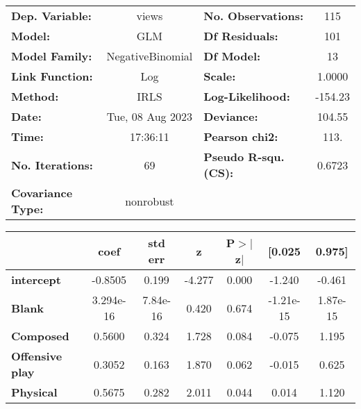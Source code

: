 \begin{center}
\begin{tabular}{lclc}
\toprule
\textbf{Dep. Variable:}         &      views       & \textbf{  No. Observations:  } &      115    \\
\textbf{Model:}                 &       GLM        & \textbf{  Df Residuals:      } &      101    \\
\textbf{Model Family:}          & NegativeBinomial & \textbf{  Df Model:          } &       13    \\
\textbf{Link Function:}         &       Log        & \textbf{  Scale:             } &    1.0000   \\
\textbf{Method:}                &       IRLS       & \textbf{  Log-Likelihood:    } &   -154.23   \\
\textbf{Date:}                  & Tue, 08 Aug 2023 & \textbf{  Deviance:          } &    104.55   \\
\textbf{Time:}                  &     17:36:11     & \textbf{  Pearson chi2:      } &     113.    \\
\textbf{No. Iterations:}        &        69        & \textbf{  Pseudo R-squ. (CS):} &   0.6723    \\
\textbf{Covariance Type:}       &    nonrobust     & \textbf{                     } &             \\
\bottomrule
\end{tabular}
\begin{tabular}{lcccccc}
                                & \textbf{coef} & \textbf{std err} & \textbf{z} & \textbf{P$> |$z$|$} & \textbf{[0.025} & \textbf{0.975]}  \\
\midrule
\textbf{intercept}              &      -0.8505  &        0.199     &    -4.277  &         0.000        &       -1.240    &       -0.461     \\
\textbf{Blank}                  &    3.294e-16  &     7.84e-16     &     0.420  &         0.674        &    -1.21e-15    &     1.87e-15     \\
\textbf{Composed}               &       0.5600  &        0.324     &     1.728  &         0.084        &       -0.075    &        1.195     \\
\textbf{Offensive play}         &       0.3052  &        0.163     &     1.870  &         0.062        &       -0.015    &        0.625     \\
\textbf{Physical}               &       0.5675  &        0.282     &     2.011  &         0.044        &        0.014    &        1.120     \\

\end{tabular}
\end{center}
